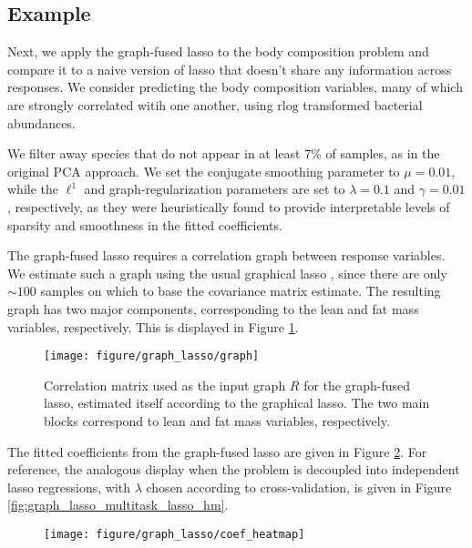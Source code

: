 \documentclass{article}
\begin{document}
\subsection{Example}
\label{subsec:graph_fused_example}

Next, we apply the graph-fused lasso to the body composition problem and compare
it to a naive version of lasso that doesn't share any information across
responses. We consider predicting the body composition variables, many of which
are strongly correlated witih one another, using $\text{rlog}$ transformed
bacterial abundances.

We filter away species that do not appear in at least 7\% of samples,
as in the original PCA approach. We set the conjugate smoothing parameter to
$\mu = 0.01$, while the $\ell^{1}$ and graph-regularization parameters are set
to $\lambda = 0.1$ and $\gamma = 0.01$, respectively, as they were heuristically
found to provide interpretable levels of sparsity and smoothness in the fitted
coefficients.

The graph-fused lasso requires a correlation graph between response variables.
We estimate such a graph using the usual graphical lasso
\citep{friedman2008sparse}, since there are only $\sim 100$ samples on which to
base the covariance matrix estimate. The resulting graph has two major
components, corresponding to the lean and fat mass variables, respectively. This
is displayed in Figure \ref{fig:graph_lasso_graph}.

\begin{figure}[ht]
  \centering
  \texttt{[image: figure/graph\_lasso/graph]}
  \caption{Correlation matrix used as the input graph $R$ for the graph-fused
    lasso, estimated itself according to the graphical
    lasso. The two main blocks correspond to lean and fat mass variables,
    respectively. \label{fig:graph_lasso_graph} }
\end{figure}

The fitted coefficients from the graph-fused lasso are given in Figure
\ref{fig:graph_lasso_coef_heatmap}. For reference, the analogous display when
the problem is decoupled into independent lasso regressions, with $\lambda$
chosen according to cross-validation, is given in Figure
\ref{fig:graph_lasso_multitask_lasso_hm}.

\begin{figure}[ht]
  \centering
  \texttt{[image: figure/graph\_lasso/coef\_heatmap]}
  \caption{\label{fig:graph_lasso_coef_heatmap} }
\end{figure}
\end{document}
